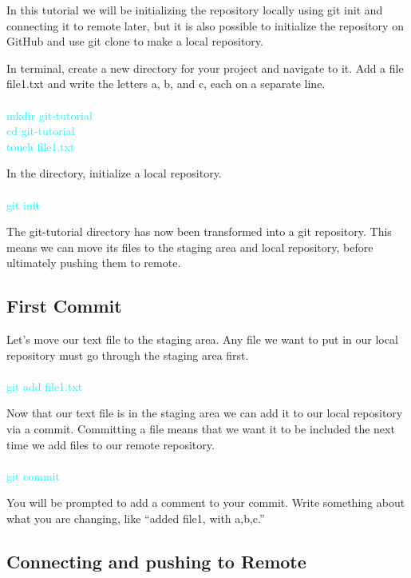 \documentclass[10pt,twocolumn]{article}
\begin{document}
In this tutorial we will be initializing the repository locally using git init and connecting it to remote later, but it is also possible to initialize the repository on GitHub and use git clone to make a local repository. 

In terminal, create a new directory for your project and navigate to it. Add a file file1.txt and write the letters a, b, and c, each on a separate line.\\\\
\textcolor{cyan}{
mkdir git-tutorial\\
cd git-tutorial\\
touch file1.txt\\
}

In the directory, initialize a local repository.\\\\
\textcolor{cyan}{
git init\\
}

The git-tutorial directory has now been transformed into a git repository. This means we can move its files to the staging area and local repository, before ultimately pushing them to remote. 


\subsection{First Commit}

Let’s move our text file to the staging area. Any file we want to put in our local repository must go through the staging area first. \\\\
\textcolor{cyan}{
git add file1.txt\\
}

Now that our text file is in the staging area we can add it to our local repository via a commit. Committing a file means that we want it to be included the next time we add files to our remote repository.\\\\
\textcolor{cyan}{
git commit\\
}

You will be prompted to add a comment to your commit. Write something about what you are changing, like “added file1, with a,b,c.” 

\subsection{Connecting and pushing to Remote}
\end{document}

